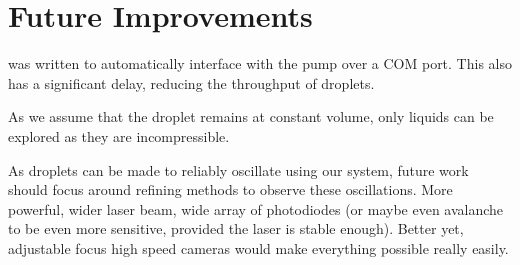 \documentclass{physics_article_B}
\begin{document}
    
\section{Future Improvements}

was written to automatically interface with the pump over a COM port. This also has a significant delay, reducing the throughput of droplets.

As we assume that the droplet remains at constant volume, only liquids can be explored as they are incompressible.

As droplets can be made to reliably oscillate using our system, future work should focus around refining methods to observe these oscillations. More powerful, wider laser beam, wide array of photodiodes (or maybe even avalanche to be even more sensitive, provided the laser is stable enough). Better yet, adjustable focus high speed cameras would make everything possible really easily.

\newpage



\end{document}
